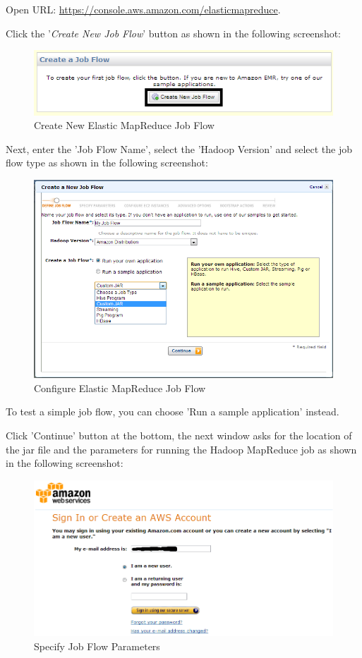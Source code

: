 Open URL: \url{https://console.aws.amazon.com/elasticmapreduce}.

Click the '\emph{Create New Job Flow}' button as shown in the following screenshot:
\begin{figure}[h]
  \centering
  \includegraphics[width=.8\textwidth]{figs/5163os_08_23.png}
  \caption{Create New Elastic MapReduce Job Flow}\label{fig:aws.elasticmapred.createflow}
\end{figure} 

Next, enter the 'Job Flow Name', select the 'Hadoop Version' and select the job flow type as shown in the following screenshot:
\begin{figure}[h]
  \centering
  \includegraphics[width=.8\textwidth]{figs/5163os_08_24.png}
  \caption{Configure Elastic MapReduce Job Flow}\label{fig:aws.elasticmapred.config}
\end{figure} 

To test a simple job flow, you can choose 'Run a sample application' instead.

Click 'Continue' button at the bottom, the next window asks for the location of the jar file and the parameters for running the Hadoop MapReduce job as shown in the following screenshot:
\begin{figure}[h]
  \centering
  \includegraphics[width=.8\textwidth]{figs/5163os_08_01.png}
  \caption{Specify Job Flow Parameters}\label{fig:aws.elasticmapred.specify.param}
\end{figure} 

